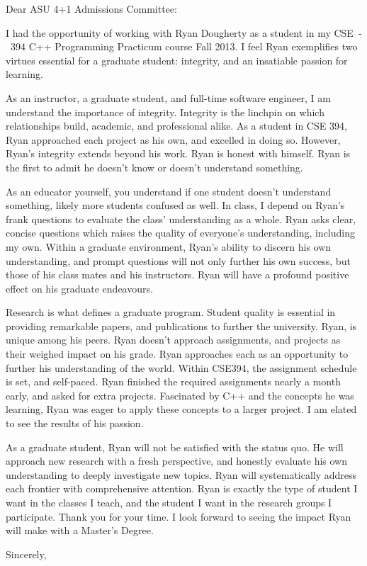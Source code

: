 \documentclass{letter}
\begin{document}
\begin{letter}{}
\opening{Dear ASU 4+1 Admissions Committee:}

I had the opportunity of working with Ryan Dougherty as a student in my CSE~-~394
C++ Programming Practicum course Fall 2013. I feel Ryan exemplifies
two virtues essential for a graduate student: integrity, and an
insatiable passion for learning. 

As an instructor, a graduate student, and full-time software engineer, I am
understand the importance of integrity. Integrity is the linchpin on which
relationships build, academic, and professional alike. As a student in CSE 394, Ryan
approached each project as his own, and excelled in doing so. However, Ryan's
integrity extends beyond his work. Ryan is honest with himself. Ryan is the
first to admit he doesn't know or doesn't understand something. 

As an educator yourself, you understand if one student doesn't
understand something, likely more students confused as well. In class,
I depend on Ryan's frank questions to evaluate the class' understanding as
a whole. Ryan asks clear, concise questions which raises the quality of
everyone's understanding, including my own. Within a graduate environment,
Ryan's ability to discern his own understanding, and prompt questions will not
only further his own success, but those of his class mates
and his instructors. Ryan will have a profound positive effect on his graduate
endeavours. 

Research is what defines a graduate program. Student quality is
essential in providing remarkable papers, and publications to further the
university. Ryan, is unique among his peers. Ryan doesn't approach assignments,
and projects as their weighed impact on his grade. Ryan approaches each as an
opportunity to further his understanding of the world. Within CSE394, the
assignment schedule is set, and self-paced. Ryan finished the required
assignments nearly a month early, and asked for extra projects. Fascinated by
C++ and the concepts he was learning, Ryan was eager to apply these concepts to
a larger project. I am elated to see the results of his passion. 

As a graduate student, Ryan will not be satisfied with the status quo. He will
approach new research with a fresh perspective, and honestly evaluate his own
understanding to deeply investigate new topics. Ryan will systematically address
each frontier with comprehensive attention. Ryan is exactly the type of student
I want in the classes I teach, and the student I want in the research groups
I participate. Thank you for your time. I look forward to seeing the impact Ryan
will make with a Master's Degree.  



\closing{Sincerely,}
\end{letter}
\end{document}
